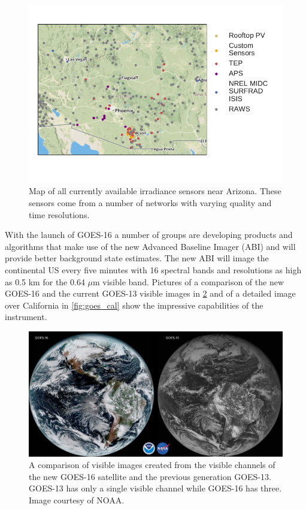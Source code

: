 \begin{figure}
\centering
\includegraphics[width=\textwidth]{figs/azmap.pdf}
\vspace{-3em}
\caption[Map of all available irradiance sensors]{Map of all currently
available irradiance sensors near Arizona. These sensors come from a
number of networks with varying quality and time resolutions.}
\label{fig:allsensors}
\end{figure}

With the launch of GOES-16 a number of groups are developing products
and algorithms that make use of the new Advanced Baseline Imager
(ABI) and will provide better background state estimates.
The new ABI will image the continental US every five minutes with 16
spectral bands and resolutions as high as 0.5 km for the 0.64 $\mu$m
visible band.
Pictures of a comparison of the new GOES-16 and the current GOES-13
visible images in \cref{fig:goes_comp} and of a detailed image over
California in \cref{fig:goes_cal} show the impressive capabilities of
the instrument.

\begin{figure}[t]
\centering
\includegraphics[width=\textwidth]{figs/goes_comp.jpg}
\caption[Comparison of visible images from the current and future
GOES]{A comparison of visible images created from the visible channels
of the new GOES-16 satellite and the previous generation
GOES-13. GOES-13 has only a single visible channel while GOES-16 has
three. Image courtesy of NOAA.}
\label{fig:goes_comp}
\end{figure}

